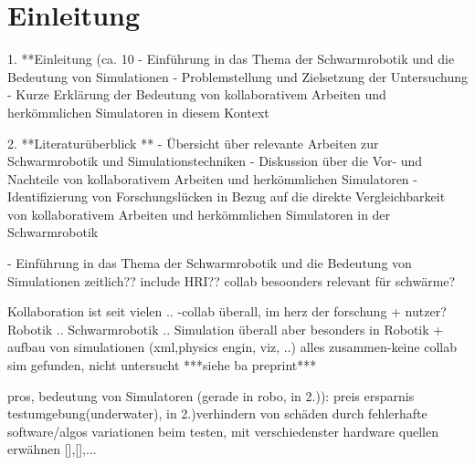 \documentclass[german,version-2020-11]{uzl-thesis}
\begin{document}
%
%


\chapter{Einleitung}


%
1. **Einleitung (ca. 10%
   - Einführung in das Thema der Schwarmrobotik und die Bedeutung von Simulationen
   - Problemstellung und Zielsetzung der Untersuchung
   - Kurze Erklärung der Bedeutung von kollaborativem Arbeiten und herkömmlichen Simulatoren in diesem Kontext

2. **Literaturüberblick **
   - Übersicht über relevante Arbeiten zur Schwarmrobotik und Simulationstechniken
   - Diskussion über die Vor- und Nachteile von kollaborativem Arbeiten und herkömmlichen Simulatoren
   - Identifizierung von Forschungslücken in Bezug auf die direkte Vergleichbarkeit von kollaborativem Arbeiten und herkömmlichen Simulatoren in der Schwarmrobotik





  - Einführung in das Thema der Schwarmrobotik und die Bedeutung von Simulationen
zeitlich??
include HRI?? collab besoonders relevant für schwärme?

Kollaboration ist seit vielen ..
-collab überall, im herz der forschung + nutzer? 
Robotik ..
Schwarmrobotik ..
Simulation überall aber besonders in Robotik + aufbau von simulationen (xml,physics engin, viz, ..)
alles zusammen-keine collab sim gefunden, nicht untersucht
***siehe ba preprint***


      
      
      pros, bedeutung von Simulatoren (gerade in robo, in 2.)):
        preis ersparnis  testumgebung(underwater), 
        in 2.)verhindern von schäden durch fehlerhafte software/algos
        variationen beim testen, mit verschiedenster hardware  
        quellen erwähnen [],[],...

    
      
        
      
\end{document}
